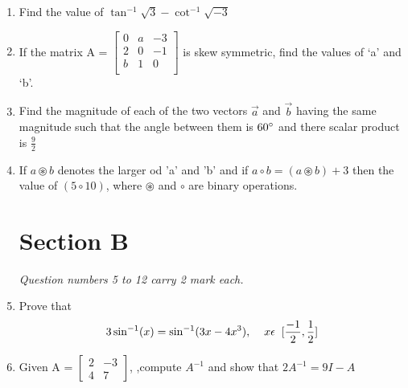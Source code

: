 \documentclass{exam}
\begin{document}
     
     
     \vspace{4mm}
    
     \begin{enumerate}
     
     \item Find the value of $ \tan^{-1}\sqrt{3} - \cot^{-1}\sqrt{-3} $
     
     \item \noindent If the matrix A = 
     $\begin{bmatrix}
     0 & a & -3 \\
     2 & 0 & -1 \\
     b & 1 & 0 \\
     \end{bmatrix} $
     is skew symmetric, find the values of ‘a’ and      ‘b’.
     
     \item Find the magnitude of each of the two vectors $\vec{a}$ and $\vec{b}$ having the same magnitude such that the angle between them is $60\degree$ and there scalar product is $\frac{9}{2}$
     
     \item If $ a \circledast b $ denotes the larger od 'a' and 'b' and if $ a \circ b = (a \circledast b) + 3 $ then the value of $ (5 \circ 10 ) $, where $\circledast $ and $ \circ $ are binary operations.
     
    \begin{center}
    \section*{Section B}
    \end{center}
    
    \begin{flushleft}
      \textit{ Question numbers 5 to 12 carry 2 mark each.}
     \end{flushleft}
    
    
    \item Prove that 
    $$ 3\sin^{-1}(x) = \sin^{-1}(3x-4x^{3}),\hspace{4mm} x \epsilon \hspace{2mm} [\frac{-1}{2},\frac{1}{2}] $$
    
    \item \noindent Given A = 
 $\begin{bmatrix}
  2 & -3\\ 
  4 & 7
\end{bmatrix}$,  
,compute $A^{-1}$ and show that $2A^{-1} = 9I - A $


\end{enumerate}
\end{document}
